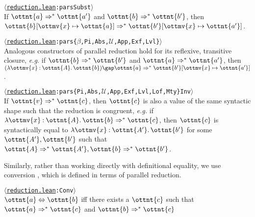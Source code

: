 \documentclass[a4paper,UKenglish,cleveref,autoref,thm-restate]{lipics-v2021}
\makeatletter
\newcommand{\repo}{https://github.com/ionathanch/TTBFL}
\newcommand{\eg}{\textit{e.g.}\@\xspace}
\newcommand{\thmref}[2]{%
  $\langle$\href{\repo/tree/main/src/#1}{\texttt{#1}}\texttt{:#2}$\rangle$%
}
\makeatother
\begin{document}
\begin{lemma}[Substitution (p.r.)] \thmref{reduction.lean}{parsSubst} \label{lem:pars:subst} \\
  If $ \ottnt{a}  \Rightarrow^\ast  \ottnt{a'} $ and $ \ottnt{b}  \Rightarrow^\ast  \ottnt{b'} $,
  then $  \ottnt{b} [  \ottmv{x}  \mapsto  \ottnt{a}  ]   \Rightarrow^\ast   \ottnt{b'} [  \ottmv{x}  \mapsto  \ottnt{a'}  ]  $.
\end{lemma}

\begin{lemma}[Construction (p.r.)] \thmref{reduction.lean}{pars\{$\beta$,Pi,Abs,$\mathcal{U}$,App,Exf,Lvl\}} \label{lem:pars:cons} \\
  Analogous constructors of parallel reduction hold
  for its reflexive, transitive closure,
  \eg if $ \ottnt{b}  \Rightarrow^\ast  \ottnt{b'} $ and $ \ottnt{a}  \Rightarrow^\ast  \ottnt{a'} $,
  then $   (  \lambda  \ottmv{x}  \mathbin{:}  \ottnt{A}  \mathpunct{.}  \ottnt{b}  )   \gap  \ottnt{a}   \Rightarrow^\ast   \ottnt{b'} [  \ottmv{x}  \mapsto  \ottnt{a'}  ]  $.
\end{lemma}

\begin{lemma}[Inversion (p.r.)] \thmref{reduction.lean}{pars\{Pi,Abs,$\mathcal{U}$,App,Exf,Lvl,Lof,Mty\}Inv} \label{lem:pars:inv} \\
  If $ \ottnt{v}  \Rightarrow^\ast  \ottnt{c} $, then $\ottnt{c}$ is also a value of the same syntactic shape
  such that the reduction is congruent,
  \eg if $  \lambda  \ottmv{x}  \mathbin{:}  \ottnt{A}  \mathpunct{.}  \ottnt{b}   \Rightarrow^\ast  \ottnt{c} $, then $\ottnt{c}$ is syntactically equal to $ \lambda  \ottmv{x}  \mathbin{:}  \ottnt{A'}  \mathpunct{.}  \ottnt{b'} $
  for some $\ottnt{A'}, \ottnt{b'}$ such that $ \ottnt{A}  \Rightarrow^\ast  \ottnt{A'} ,  \ottnt{b}  \Rightarrow^\ast  \ottnt{b'} $.
\end{lemma}

Similarly, rather than working directly with definitional equality,
we use conversion ,
which is defined in terms of parallel reduction.

\begin{definition}[Conversion] \thmref{reduction.lean}{Conv} \\
  $ \ottnt{a}  \Leftrightarrow  \ottnt{b} $ iff there exists a $\ottnt{c}$ such that
  $ \ottnt{a}  \Rightarrow^\ast  \ottnt{c} $ and $ \ottnt{b}  \Rightarrow^\ast  \ottnt{c} $
\end{definition}
\end{document}
